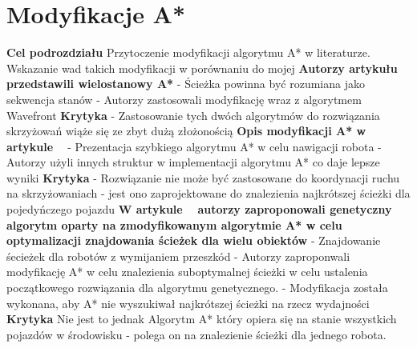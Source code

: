 \section{Modyfikacje A*}
\textbf{Cel podrozdziału}
\newline
Przytoczenie modyfikacji algorytmu A* w literaturze. Wskazanie wad takich modyfikacji w porównaniu do mojej
\newline
\newline
\textbf{Autorzy artykułu ~\cite{wojnicki2015robust} przedstawili wielostanowy A* }
\newline
- Ścieżka powinna być rozumiana jako sekwencja stanów
\newline
- Autorzy zastosowali modyfikację wraz z algorytmem Wavefront
\newline
\newline
\textbf{Krytyka}
\newline
- Zastosowanie tych dwóch algorytmów do rozwiązania skrzyżowań wiąże się ze zbyt dużą złożonością
\newline
\newline
\textbf{Opis modyfikacji A* w artykule ~\cite{munteanmobile}}
\newline
- Prezentacja szybkiego algorytmu A* w celu nawigacji robota
\newline
- Autorzy użyli innych struktur w implementacji algorytmu A* co daje lepsze wyniki
\textbf{Krytyka}
\newline
- Rozwiązanie nie może być zastosowane do koordynacji ruchu na skrzyżowaniach - jest ono zaprojektowane do znalezienia najkrótszej ścieżki dla pojedyńczego pojazdu
\newline
\newline
\textbf{W artykule ~\cite{oleiwi2014modified} autorzy zaproponowali genetyczny algorytm oparty na zmodyfikowanym algorytmie A* w celu optymalizacji znajdowania ścieżek dla wielu obiektów}
\newline
- Znajdowanie śecieżek dla robotów z wymijaniem przeszkód
\newline
- Autorzy zaproponwali modyfikację A* w celu znalezienia suboptymalnej ścieżki w celu ustalenia początkowego rozwiązania dla algorytmu genetycznego.
\newline
- Modyfikacja została wykonana, aby A* nie wyszukiwał najkrótszej ścieżki na rzecz wydajności
\newline
\newline
\textbf{Krytyka}
\newline
Nie jest to jednak Algorytm A* który opiera się na stanie wszystkich pojazdów w środowisku - polega on na znalezienie ścieżki dla jednego robota.
